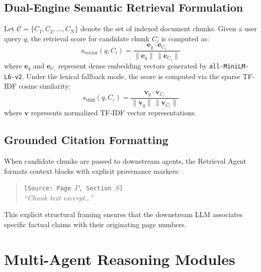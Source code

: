 \documentclass[conference]{IEEEtran}
\begin{document}
\subsection{Dual-Engine Semantic Retrieval Formulation}
Let $\mathcal{C} = \{C_1, C_2, \dots, C_N\}$ denote the set of indexed document chunks. Given a user query $q$, the retrieval score for candidate chunk $C_i$ is computed as:
\begin{equation}
s_{\text{vector}}(q, C_i) = \frac{\mathbf{e}_q \cdot \mathbf{e}_{C_i}}{\|\mathbf{e}_q\| \, \|\mathbf{e}_{C_i}\|}
\end{equation}
where $\mathbf{e}_q$ and $\mathbf{e}_{C_i}$ represent dense embedding vectors generated by \texttt{all-MiniLM-L6-v2}. Under the lexical fallback mode, the score is computed via the sparse TF-IDF cosine similarity:
\begin{equation}
s_{\text{tfidf}}(q, C_i) = \frac{\mathbf{v}_q \cdot \mathbf{v}_{C_i}}{\|\mathbf{v}_q\| \, \|\mathbf{v}_{C_i}\|}
\end{equation}
where $\mathbf{v}$ represents normalized TF-IDF vector representations.

\subsection{Grounded Citation Formatting}
When candidate chunks are passed to downstream agents, the Retrieval Agent formats context blocks with explicit provenance markers:
\begin{quote}
\texttt{[Source: Page $P$, Section $S$]}\\
\textit{\small``Chunk text excerpt\dots''}
\end{quote}
This explicit structural framing ensures that the downstream LLM associates specific factual claims with their originating page numbers.

\section{Multi-Agent Reasoning Modules}
\end{document}

